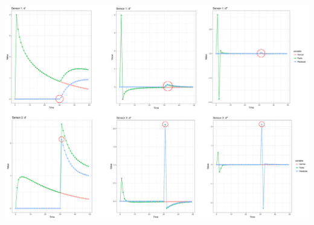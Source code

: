 \documentclass{tikzposter}
\begin{document}
\begin{columns}
{{				%

				\vspace{15mm}

				\begin{center}
					\includegraphics[height=20cm]{./Images/attack_peak_circled.png}
				\end{center}

			}
		}
	\end{columns}
\end{document}
